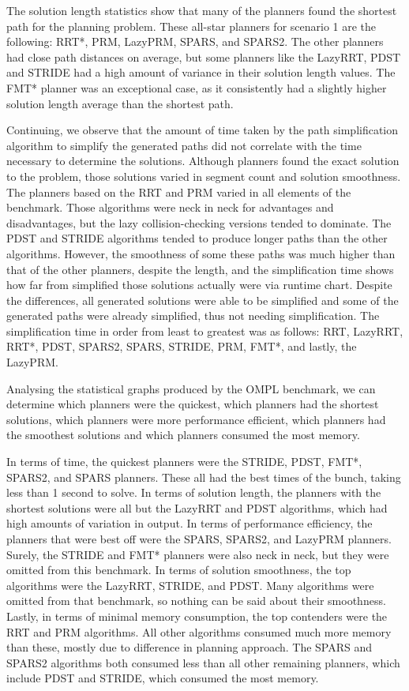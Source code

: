 \documentclass[conference]{IEEEtran} \usepackage[T1]{fontenc} \usepackage[backend=biber, style=ieee]{biblatex}
\begin{document}
The solution length statistics show that many of the planners found the shortest path for the planning problem. These all-star planners for scenario 1 are the following: RRT*,
PRM, LazyPRM, SPARS, and SPARS2. The other planners had close path distances on average, but some planners like the LazyRRT, PDST and STRIDE had a high amount of variance in 
their solution length values. The FMT* planner was an exceptional case, as it consistently had a slightly higher solution length average than the shortest path.

Continuing, we observe that the amount of time taken by the path simplification algorithm to simplify the generated paths did not correlate with the time necessary to determine
the solutions. Although planners found the exact solution to the problem, those solutions varied in segment count and solution smoothness. The planners based on the RRT
and PRM varied in all elements of the benchmark. Those algorithms were neck in neck for advantages and disadvantages, but the lazy collision-checking versions tended to dominate. 
The PDST and STRIDE algorithms tended to produce longer paths than the other algorithms. However, the smoothness of some these paths was much higher than that of the other 
planners, despite the length, and the simplification time shows how far from simplified those solutions actually were via runtime chart. Despite the differences, all generated 
solutions were able to be simplified and some of the generated paths were already simplified, thus not needing simplification. The simplification time in order from least to greatest was as follows: RRT, LazyRRT, RRT*, PDST, SPARS2, SPARS, STRIDE, PRM, FMT*, and lastly, the LazyPRM. 

Analysing the statistical graphs produced by the OMPL benchmark, we can determine which planners were the quickest, which planners had the shortest solutions, which planners
were more performance efficient, which planners had the smoothest solutions and which planners consumed the most memory.

In terms of time, the quickest planners were the STRIDE, PDST, FMT*, SPARS2, and SPARS planners. These all had the best times of the bunch, taking less than 1 second to solve.
In terms of solution length, the planners with the shortest solutions were all but the LazyRRT and PDST algorithms, which had high amounts of variation in output. In terms of
performance efficiency, the planners that were best off were the SPARS, SPARS2, and LazyPRM planners. Surely, the STRIDE and FMT* planners were also neck in neck, but they were
omitted from this benchmark. In terms of solution smoothness, the top algorithms were the LazyRRT, STRIDE, and PDST. Many algorithms were omitted from that benchmark,
so nothing can be said about their smoothness. Lastly, in terms of minimal memory consumption, the top contenders were the RRT and PRM algorithms. All other algorithms 
consumed much more memory than these, mostly due to difference in planning approach. The SPARS and SPARS2 algorithms both consumed less than all other remaining planners, which
include PDST and STRIDE, which consumed the most memory.
\end{document}
